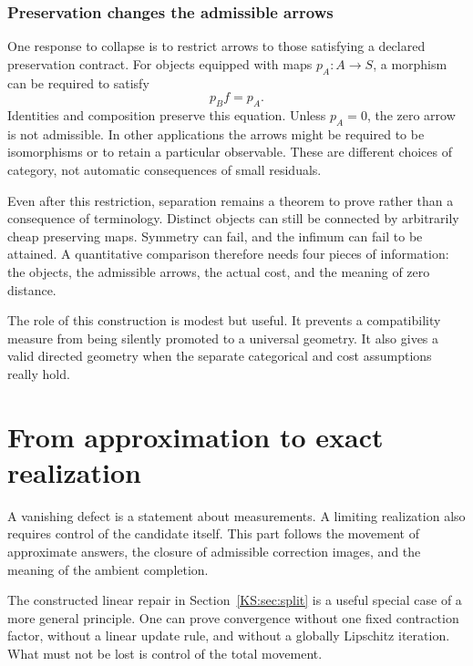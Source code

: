 \subsection{Preservation changes the admissible arrows}
One response to collapse is to restrict arrows to those satisfying a declared preservation contract. For objects equipped with maps \(p_A:A\to S\), a morphism can be required to satisfy
\[
 p_Bf=p_A.
\]
Identities and composition preserve this equation. Unless \(p_A=0\), the zero arrow is not admissible. In other applications the arrows might be required to be isomorphisms or to retain a particular observable. These are different choices of category, not automatic consequences of small residuals.

Even after this restriction, separation remains a theorem to prove rather than a consequence of terminology. Distinct objects can still be connected by arbitrarily cheap preserving maps. Symmetry can fail, and the infimum can fail to be attained. A quantitative comparison therefore needs four pieces of information: the objects, the admissible arrows, the actual cost, and the meaning of zero distance.

The role of this construction is modest but useful. It prevents a compatibility measure from being silently promoted to a universal geometry. It also gives a valid directed geometry when the separate categorical and cost assumptions really hold.




\chapter{From approximation to exact realization}\label{KS:book:chapter-23}
A vanishing defect is a statement about measurements. A limiting realization also requires control of the candidate itself. This part follows the movement of approximate answers, the closure of admissible correction images, and the meaning of the ambient completion.

\label{KS:sec:variable-exactification}
The constructed linear repair in Section~\ref{KS:sec:split} is a useful special case of a more general principle. One can prove convergence without one fixed contraction factor, without a linear update rule, and without a globally Lipschitz iteration. What must not be lost is control of the total movement.

